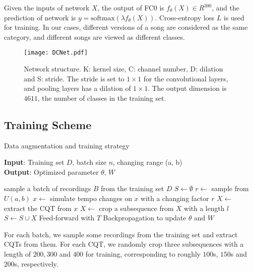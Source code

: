 \documentclass{article}
\begin{document}
Given the inputs of network $X$, the output of FC$0$ is  $f_\theta(X)\in R^{300}$, and the prediction of network is $y = \mathrm{softmax}(\lambda f_\theta(X))$. Cross-entropy loss $L$ is used for training. In our cases, different versions of a song are considered as the same category, and different songs are viewed as different classes.

\begin{figure}[h]
    \centering
    \texttt{[image: DCNet.pdf]}
    \caption{Network structure. K: kernel size, C: channel number, D: dilation and S: stride. The stride is set to $1\times1$ for the convolutional layers, and pooling layers has a dilation of $1\times1$. The output dimension is $4611$, the number of classes in the training set.}
    \label{fig:net}
\end{figure}



\subsection{Training Scheme}

\begin{algorithm}[ht]
  \caption{Data augmentation and training strategy}
  \label{alg:alg}
  \textbf{Input}: Training set $D$, batch size $n$, changing range (a, b) \\
  \textbf{Output}: Optimized parameter $\theta$, $W$
  \begin{algorithmic}[1]
  \REPEAT
  \STATE sample a batch of recordings $B$ from the training set $D$
  \STATE $S \gets \emptyset$
  \STATE $r \gets$ sample from $U(a, b)$
  \STATE $x \gets$ simulate tempo changes on $x$ with a changing factor $r$
  \STATE $X \gets$ extract the CQT from $x$
  \STATE $X \gets$ crop a subsequence from $X$ with a length $l$
  \STATE $S \gets S \cup X$
  \ENDFOR
  \STATE Feed-forward with $T$
  \STATE Backpropagation to update $\theta$ and $W$
  \ENDFOR

  \end{algorithmic}
\end{algorithm}

For each batch, we sample some recordings from the training set and extract CQTs from them. For each CQT, we randomly crop three subsequences with a length of $200, 300$ and $400$ for training, corresponding to roughly $100$s, $150$s and $200$s, respectively. 
\end{document}
